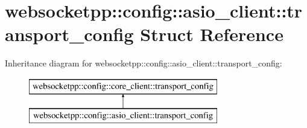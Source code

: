 \hypertarget{structwebsocketpp_1_1config_1_1asio__client_1_1transport__config}{}\section{websocketpp\+:\+:config\+:\+:asio\+\_\+client\+:\+:transport\+\_\+config Struct Reference}
\label{structwebsocketpp_1_1config_1_1asio__client_1_1transport__config}
Inheritance diagram for websocketpp\+:\+:config\+:\+:asio\+\_\+client\+:\+:transport\+\_\+config\+:\begin{figure}[H]
\begin{center}
\leavevmode
\includegraphics[height=2.000000cm]{structwebsocketpp_1_1config_1_1asio__client_1_1transport__config}
\end{center}
\end{figure}
